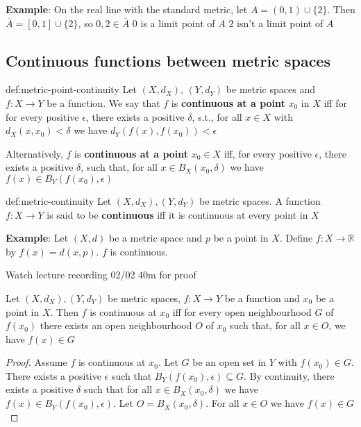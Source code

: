 \documentclass[landscape, 8pt]{extarticle}
\begin{document}
\begin{multicols}{3}
\textbf{Example}: On the real line with the standard metric, let $A = (0,1) \cup \{2\}$. Then $\overline{A} = [0,1]\cup \{2\}$, so $0,2\in \overline{A}$
$0$ is a limit point of $A$
$2$ isn't a limit point of $A$

\subsection{Continuous functions between metric spaces}

\begin{dfn}{def:metric-point-continuity}{}
    Let $(X, d_{X}),\, (Y,d_{Y})$ be metric spaces and $f: X \to Y $ be a function. We say that $f$ is \textbf{continuous at a point} $x_{0}$ in $X$ iff for for every positive $\epsilon$, there exists a positive $\delta$, s.t., for all $x\in X$ with $d_{X}(x,x_{0}) < \delta$ we have $d_{Y}(f(x), f(x_{0})) < \epsilon$
    
    \longrule{0.08ex}
    Alternatively, $f$ is \textbf{continuous at a point} $x_{0}\in X$ iff, for every positive $\epsilon$, there exists a positive $\delta$, such that, for all $x\in B_{X}(x_{0}, \delta)$ we have $f(x)\in B_{Y}(f(x_{0}), \epsilon)$
\end{dfn}

\begin{dfn}{def:metric-continuity}{}
    Let $(X, d_{X}), (Y, d_{Y})$ be metric spaces. A function $f: X \to Y $ is said to be \textbf{continuous} iff it is continuous at every point in $X$
\end{dfn}

\textbf{Example}: Let $(X, d)$ be a metric space and $p$ be a point in $X$. Define $f: X \to \mathbb{R} $ by $f(x) = d(x,p)$. $f$ is continuous.

Watch lecture recording 02/02 40m for proof

\begin{thm}[]{}{}
    Let $(X,d_{X}), (Y, d_{Y})$ be metric spaces, $f : X \to Y$ be a function and $x_{0}$ be a point in $X$. Then $f$ is continuous at $x_{0}$ iff for every open neighbourhood $G$ of $f(x_{0})$ there exists an open neighbourhood $O$ of $x_{0}$ such that, for all $x\in O$, we have $f(x) \in G$
\end{thm}

\begin{proof}
    Assume $f$ is continuous at $x_{0}$. Let $G$ be an open set in $Y$ with $f(x_{0})\in G$. There exists a positive $\epsilon$ such that $B_{Y}(f(x_{0}), \epsilon) \subseteq G$. By continuity, there exists a positive $\delta$ such that for all $x\in B_{X}(x_{0}, \delta)$ we have $f(x)\in B_{Y}(f(x_{0}), \epsilon)$. Let $O = B_{X}(x_{0}, \delta)$. For all $x\in O$ we have $f(x)\in G$
\end{proof}


\end{multicols}
\end{document}
